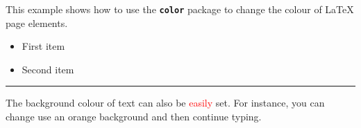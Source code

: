 \documentclass{article}
\begin{document}
This example shows how to use the \texttt{\bfseries color} package to change the colour of \LaTeX{} page elements.

\begin{itemize}
\color{ForestGreen}
\item First item
\item Second item
\end{itemize}

\noindent
{\color{RubineRed} \rule{\linewidth}{0.5mm}}

The background colour of text can also be \textcolor{red}{easily} set. For  instance, you can change use an \colorbox{BurntOrange}{orange background} and then continue typing.
\end{document}
